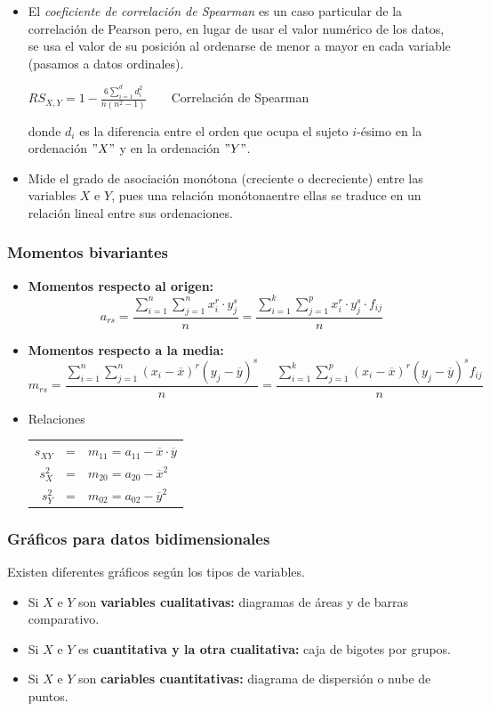 \begin{itemize}
	\item El \textit{coeficiente de correlación de Spearman} es un caso particular de la correlación de Pearson pero, en lugar de usar el valor numérico de los datos, se usa el valor de su posición al ordenarse de menor a mayor en cada variable (pasamos a datos ordinales). \begin{center}$RS_{X,Y}=1-\displaystyle \frac{6\sum_{i=1}^{d}{d_{i}^2}}{n(n^{2}-1)}$~~~~Correlación de Spearman\end{center} donde $d_{i}$ es la diferencia entre el orden que ocupa el sujeto $i$-ésimo en la ordenación $"X"$ y en la ordenación $"Y"$.
	\item Mide el grado de asociación monótona (creciente o decreciente) entre las variables $X$ e $Y$, pues una relación monótonaentre ellas se traduce en un relación lineal entre sus ordenaciones.
\end{itemize}

\subsubsection{Momentos bivariantes}
\begin{itemize}
	\item \textbf{Momentos respecto al origen:} $$a_{rs}=\frac{\sum_{i=1}^{n}\sum_{j=1}^{n}{x_{i}^{r}\cdot y_{j}^{s}}}{n}=\frac{\sum_{i=1}^{k}\sum_{j=1}^{p}{x_{i}^{r}\cdot y_{j}^{s} \cdot f_{ij}}}{n}$$
	\item \textbf{Momentos respecto a la media:}$$m_{rs}=\frac{\sum_{i=1}^{n}\sum_{j=1}^{n}{(x_{i}-\overline{x})^{r}(y_{j}-\overline{y})^{s}}}{n}=\frac{\sum_{i=1}^{k}\sum_{j=1}^{p}{(x_{i}-\overline{x})^{r}(y_{j}-\overline{y})^{s}f_{ij}}}{n}$$
	\item Relaciones \begin{center}\begin{tabular}{rcl}$s_{XY}$ &=& $m_{11}=a_{11}-\overline{x}\cdot \overline{y}$\\$s_{X}^{2}$ &=& $m_{20}=a_{20}-\overline{x}^{2}$\\$s_{Y}^{2}$ &=& $m_{02}=a_{02}-\overline{y}^{2}$\end{tabular}\end{center}
\end{itemize}
\subsubsection{Gráficos para datos bidimensionales}
Existen diferentes gráficos según los tipos de variables.
\begin{itemize}
	\item Si $X$ e $Y$ son \textbf{variables cualitativas:} diagramas de áreas y de barras comparativo.
	\item Si $X$ e $Y$ es \textbf{cuantitativa y la otra cualitativa:} caja de bigotes por grupos.
	\item Si $X$ e $Y$ son \textbf{cariables cuantitativas:} diagrama de dispersión o nube de puntos.
\end{itemize}


